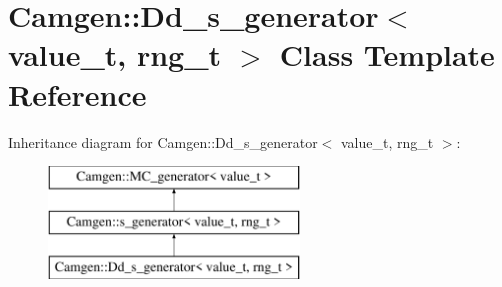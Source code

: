 \hypertarget{a00125}{\section{Camgen\-:\-:Dd\-\_\-s\-\_\-generator$<$ value\-\_\-t, rng\-\_\-t $>$ Class Template Reference}
\label{a00125}
}
Inheritance diagram for Camgen\-:\-:Dd\-\_\-s\-\_\-generator$<$ value\-\_\-t, rng\-\_\-t $>$\-:\begin{figure}[H]
\begin{center}
\leavevmode
\includegraphics[height=3.000000cm]{a00125}
\end{center}
\end{figure}
